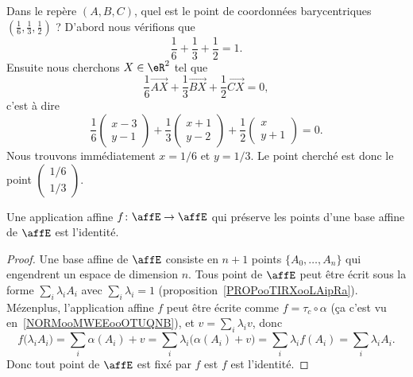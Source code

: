 \begin{example}
    Dans le repère \( (A,B,C)\), quel est le point de coordonnées barycentriques \( (\frac{1}{ 6 },\frac{1}{ 3 },\frac{1}{ 2 })\) ? D'abord nous vérifions que
    \begin{equation}
        \frac{1}{ 6 }+\frac{1}{ 3 }+\frac{1}{ 2 }=1.
    \end{equation}
    Ensuite nous cherchons \( X\in \eR^2\) tel que
    \begin{equation}
        \frac{1}{ 6 }\overrightarrow{ AX }+\frac{1}{ 3 }\overrightarrow{ BX }+\frac{1}{ 2 }\overrightarrow{ CX }=0,
    \end{equation}
    c'est à dire
    \begin{equation}
        \frac{1}{ 6 }\begin{pmatrix}
            x-3    \\
            y-1
        \end{pmatrix}+\frac{1}{ 3 }\begin{pmatrix}
            x+1    \\
            y-2
        \end{pmatrix}+\frac{1}{ 2 }\begin{pmatrix}
            x    \\
            y+1
        \end{pmatrix}=0.
    \end{equation}
    Nous trouvons immédiatement \( x=1/6\) et \( y=1/3\). Le point cherché est donc le point \( \begin{pmatrix}
        1/6    \\
        1/3
    \end{pmatrix}\).
\end{example}

\begin{lemma}       \label{LEMooDUMVooFtfFOe}
    Une application affine \( f\colon \affE\to \affE\) qui préserve les points d'une base affine de $\affE$ est l'identité.
\end{lemma}

\begin{proof}
    Une base affine de \( \affE\) consiste en \( n+1\) points \( \{ A_0,\ldots, A_n \}\) qui engendrent un espace de dimension \( n\). Tous point de \( \affE\) peut être écrit sous la forme \( \sum_i\lambda_iA_i\) avec \( \sum_i\lambda_i=1\) (proposition~\ref{PROPooTIRXooLAipRa}). Mézenplus, l'application affine \( f\) peut être écrite comme \( f=\tau_c\circ \alpha\) (ça c'est vu en~\ref{NORMooMWEEooOTUQNB}), et \( v=\sum_i\lambda_iv\), donc
    \begin{equation}
        f\big( \lambda_iA_i)=\sum_i\alpha(A_i)+v
        =\sum_i\lambda_i\big( \alpha(A_i)+v \big)
        =\sum_i\lambda_if(A_i)
        =\sum_i\lambda_iA_i.
    \end{equation}
    Donc tout point de \( \affE\) est fixé par \( f\) est \( f\) est l'identité.
\end{proof}


